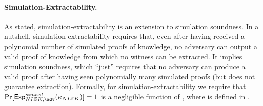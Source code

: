 \paragraph{Simulation-Extractability.} As stated, simulation-extractability
is an extension to simulation soundness. In a nutshell,
simulation-extractability requires that, even after having received a polynomial
number of simulated proofs of knowledge, no adversary can output a valid proof
of knowledge from which no witness can be extracted. It implies simulation
soundness, which ``just'' requires that no adversary can produce a valid proof
after having seen polynomially many simulated proofs (but does not guarantee
extraction). Formally, for simulation-extractability we require that
$\Pr[\ExpNIZKSimExt(\NIZKsecpar)] = 1$ is a negligible function of \secpar,
where \ExpNIZKSimExt is defined in .

